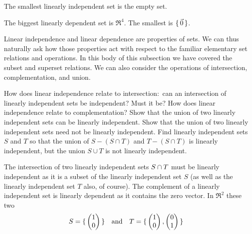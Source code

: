 \begin{exercises}
\begin{answer}
      The smallest linearly independent set is the empty set.

      The biggest linearly dependent set is \( \Re^4 \).
      The smallest is \( \mbox{$\{\,\vec{0}\,\}$} \).  
    \end{answer}
  \recommended \item 
    Linear independence and linear dependence are properties of sets.
    We can thus naturally ask how those properties act with respect to
    the familiar elementary set relations and operations.  
    In this body of this subsection we have covered the subset and superset
    relations.
    We can also consider the operations of intersection, complementation, 
    and union.
    \begin{exparts}
       \partsitem How does linear independence relate to intersection:~can
         an intersection of linearly independent sets be independent?
         Must it be?
       \partsitem How does linear independence relate to complementation?
       \partstiem Show that the union of two linearly independent sets
          can be linearly independent.
       \partsitem Show that
          the union of two linearly independent sets need not be
          linearly independent.
       \partstiem Find linearly independent sets \( S \) and \( T \)
          so that the union of \( S-(S\cap T)\) and \( T-(S\cap T) \)
          is linearly independent, but the union \( S\cup T \) is
          not linearly independent.
    \end{exparts}
    \begin{answer}
      \begin{exparts}
        \partsitem The intersection of two linearly independent sets
          $S\cap T$ must be linearly
          independent as it is a subset of the linearly independent set $S$
          (as well as the linearly independent set $T$ also, of course).
        \partsitem The complement of a linearly independent set is linearly
          dependent as it contains the zero vector.
        \partsitem In \( \Re^2 \) these two
          \begin{equation*}
            S=\mbox{$\{\,\begin{pmatrix} 1 \\ 0 \end{pmatrix}\,\}$}
            \quad\text{and}\quad
            T=\mbox{$\{\,\begin{pmatrix} 1 \\ 0 \end{pmatrix}, \begin{pmatrix} 0 \\ 1 \end{pmatrix}\,\}$}
          \end{equation*}

\end{exparts}
\end{answer}
\end{exercises}
